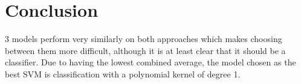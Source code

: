 \section{Conclusion}
3 models perform very similarly on both approaches which makes choosing between them more difficult, although it is at least clear that it should be a classifier. Due to having the lowest combined average, the model chosen as the best SVM is classification with a polynomial kernel of degree 1.
